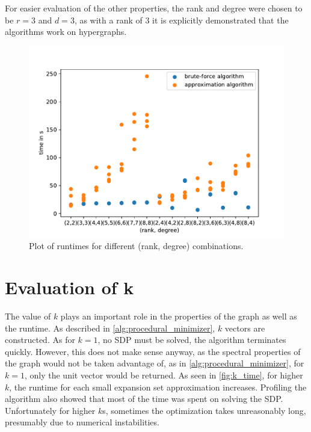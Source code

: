 For easier evaluation of the other properties, the rank and degree were chosen to be $r=3$ and $d=3$, as with a rank of $3$ it is explicitly demonstrated that the algorithms work on hypergraphs.
\begin{figure}
	\centering
	\includegraphics[scale=0.8]{figures/rank_degree_combinations_all_logs.pdf}
	\caption[Plot times rank degree combinations]{Plot of runtimes for different (rank, degree) combinations.\label{fig:rank_degree_times}}
\end{figure}


\section{Evaluation of k}

The value of $k$ plays an important role in the properties of the graph as well as the runtime. As described in \cref{alg:procedural_minimizer}, $k$ vectors are constructed.
As for $k = 1$, no SDP must be solved, the algorithm terminates quickly. However, this does not make sense anyway, as the spectral properties of the graph would not be taken advantage of, as in \cref{alg:procedural_minimizer}, for $k=1$, only the unit vector would be returned.
As seen in \cref{fig:k_time}, for higher $k$, the runtime for each small expansion set approximation increases. Profiling the algorithm also showed that most of the time was spent on solving the SDP. Unfortunately for higher $k$s, sometimes the optimization takes unreasonably long, presumably due to numerical instabilities.

